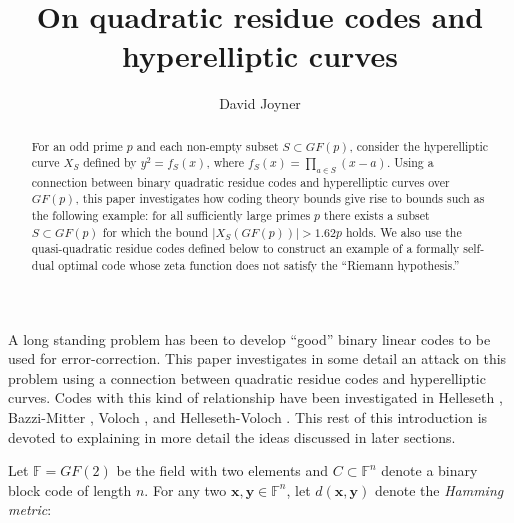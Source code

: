 \documentclass[submission%
]{dmtcs}
\author{David Joyner\addressmark{1}%
}
\title[QR codes and hyperelliptic curves]{On quadratic residue codes and hyperelliptic curves}
\def\fff{{\mathbb{F}}}
\begin{document}
\maketitle
\begin{abstract}

For an odd prime $p$ and each non-empty subset $S\subset GF(p)$, consider 
the hyperelliptic curve $X_S$ defined by $y^2=f_S(x)$, where 
$f_S(x) = \prod_{a\in S}(x-a)$.  
Using a connection between binary quadratic residue codes and hyperelliptic 
curves over $GF(p)$, this paper investigates how coding theory bounds give rise to
bounds such as the following example:
for all sufficiently large primes $p$ there exists a 
subset $S\subset GF(p)$ for which the bound $|X_S(GF(p))| > 1.62p$
holds. We also use the quasi-quadratic residue codes defined below to
construct an example of a formally self-dual optimal code whose
zeta function does not satisfy the ``Riemann hypothesis.''

\end{abstract}




A long standing problem has been to develop ``good''
binary linear codes to be used for error-correction.  
This paper investigates in some detail an attack on this problem
using a connection between quadratic residue codes and hyperelliptic 
curves. Codes with this kind of relationship 
have been investigated in Helleseth \cite{H},
Bazzi-Mitter \cite{BM}, Voloch \cite{V1}, and Helleseth-Voloch \cite{HV}. 
This rest of this introduction is devoted to explaining 
in more detail the ideas discussed in later sections.

Let $\fff=GF(2)$ be the field with two elements
and $C\subset \fff^n$ denote a binary block code
of length $n$. 
For any two $\mathbf{x},\mathbf{y}\in{\fff}^{n}$,
let $d(\mathbf{x},\mathbf{y})$ denote the {\it Hamming metric}:
\end{document}
